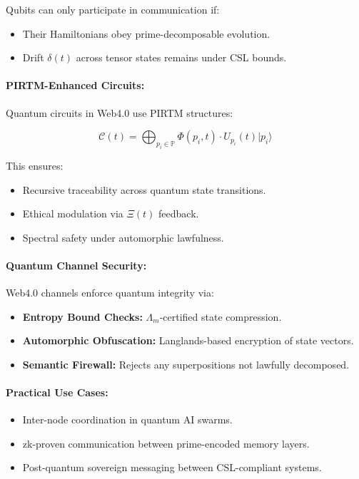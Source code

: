 \documentclass[12]{amsart}
\theoremstyle{plain}
\begin{document}
Qubits can only participate in communication if:
\begin{itemize}
  \item Their Hamiltonians obey prime-decomposable evolution.
  \item Drift $\delta(t)$ across tensor states remains under CSL bounds.
\end{itemize}

\paragraph{PIRTM-Enhanced Circuits:}
Quantum circuits in Web4.0 use PIRTM structures:

\[
\mathcal{C}(t) = \bigoplus_{p_i \in \mathbb{P}} \Phi(p_i, t) \cdot U_{p_i}(t) |p_i\rangle
\]

This ensures:
\begin{itemize}
  \item Recursive traceability across quantum state transitions.
  \item Ethical modulation via $\Xi(t)$ feedback.
  \item Spectral safety under automorphic lawfulness.
\end{itemize}

\paragraph{Quantum Channel Security:}
Web4.0 channels enforce quantum integrity via:
\begin{itemize}
  \item \textbf{Entropy Bound Checks:} $\Lambda_m$-certified state compression.
  \item \textbf{Automorphic Obfuscation:} Langlands-based encryption of state vectors.
  \item \textbf{Semantic Firewall:} Rejects any superpositions not lawfully decomposed.
\end{itemize}

\paragraph{Practical Use Cases:}
\begin{itemize}
  \item Inter-node coordination in quantum AI swarms.
  \item zk-proven communication between prime-encoded memory layers.
  \item Post-quantum sovereign messaging between CSL-compliant systems.
\end{itemize}
\end{document}
